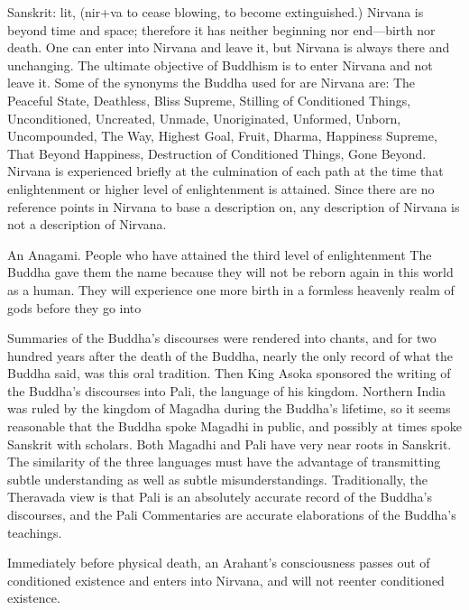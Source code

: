 \documentclass[a5paper,10pt,english]{book}
\begin{document}
\begin{description}
\sphinxAtStartPar
Sanskrit: lit,  (nir+va to cease blowing, to
become extinguished.) Nirvana is beyond time and space; therefore it has
neither beginning nor end—birth nor death. One can enter into Nirvana
and leave it, but Nirvana is always there and unchanging. The ultimate
objective of Buddhism is to enter Nirvana and not leave it. Some of the
synonyms the Buddha used for are Nirvana are: The Peaceful State,
Deathless, Bliss Supreme, Stilling of Conditioned Things, Unconditioned,
Uncreated, Unmade, Unoriginated, Unformed, Unborn, Uncompounded, The
Way, Highest Goal, Fruit, Dharma, Happiness Supreme, That Beyond
Happiness, Destruction of Conditioned Things, Gone Beyond. Nirvana is
experienced briefly at the culmination of each path at the time that
enlightenment or higher level of enlightenment is attained. Since there
are no reference points in Nirvana to base a description
on, any description of Nirvana is not a description of
Nirvana.

\sphinxAtStartPar
An Anagami. People who have attained the third level of
enlightenment The Buddha gave them the name  because
they will not be reborn again in this world as a human. They will
experience one more birth in a formless heavenly realm of gods before
they go into 

\sphinxAtStartPar
Summaries of the Buddha’s discourses were rendered into chants, and
for two hundred years after the death of the Buddha, nearly the only
record of what the Buddha said, was this oral tradition. Then King Asoka
sponsored the writing of the Buddha’s discourses into Pali, the language
of his kingdom. Northern India was ruled by the kingdom of Magadha
during the Buddha’s lifetime, so it seems reasonable that the Buddha
spoke Magadhi in public, and possibly at times spoke Sanskrit with
scholars. Both Magadhi and Pali have very near roots in Sanskrit. The
similarity of the three languages must have the advantage of
transmitting subtle understanding as well as subtle misunderstandings.
Traditionally, the Theravada view is that Pali is an absolutely accurate
record of the Buddha’s discourses, and the Pali Commentaries are
accurate elaborations of the Buddha’s teachings.

\sphinxAtStartPar
Immediately before physical death, an Arahant’s
consciousness passes out of conditioned existence and enters into
Nirvana, and will not reenter conditioned existence.


\end{description}
\end{document}
